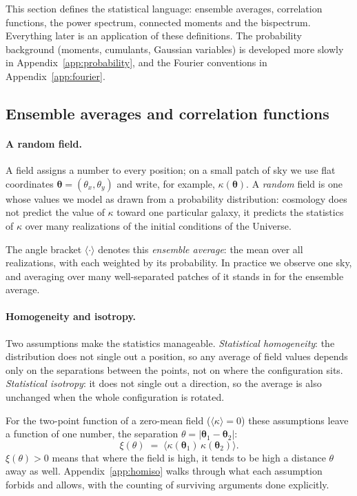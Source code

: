 \documentclass[11pt]{article}
\newcommand{\btheta}{\boldsymbol{\theta}}
\numberwithin{equation}{section}
\begin{document}
This section defines the statistical language: ensemble averages,
correlation functions, the power spectrum, connected moments and the
bispectrum.  Everything later is an application of these definitions.
The probability background (moments, cumulants, Gaussian variables)
is developed more slowly in Appendix~\ref{app:probability}, and the
Fourier conventions in Appendix~\ref{app:fourier}.

\subsection{Ensemble averages and correlation functions}
\label{sec:ensemble}

\paragraph{A random field.}
A field assigns a number to every position; on a small patch of sky we
use flat coordinates $\btheta = (\theta_x, \theta_y)$ and write, for
example, $\kappa(\btheta)$.  A \emph{random} field is one whose values
we model as drawn from a probability distribution: cosmology does not
predict the value of $\kappa$ toward one particular galaxy, it
predicts the statistics of $\kappa$ over many realizations of the
initial conditions of the Universe.

The angle bracket $\langle\cdot\rangle$ denotes this \emph{ensemble
average}: the mean over all realizations, with each weighted by its
probability.  In practice we observe one sky, and averaging over many
well-separated patches of it stands in for the ensemble average.

\paragraph{Homogeneity and isotropy.}
Two assumptions make the statistics manageable.  \emph{Statistical
homogeneity}: the distribution does not single out a position, so any
average of field values depends only on the separations between the
points, not on where the configuration sits.  \emph{Statistical
isotropy}: it does not single out a direction, so the average is also
unchanged when the whole configuration is rotated.

For the two-point function of a zero-mean field
($\langle\kappa\rangle = 0$) these assumptions leave a function of
one number, the separation $\theta = |\btheta_1 - \btheta_2|$:
\begin{equation}
  \xi(\theta) \;=\;
  \bigl\langle \kappa(\btheta_1)\,\kappa(\btheta_2) \bigr\rangle .
  \label{eq:xidef}
\end{equation}
$\xi(\theta) > 0$ means that where the field is high, it tends to be
high a distance $\theta$ away as well.  Appendix~\ref{app:homiso}
walks through what each assumption forbids and allows, with the
counting of surviving arguments done explicitly.
\end{document}
